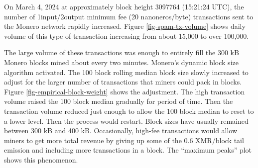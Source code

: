 \documentclass[usletter,11pt,english,openany]{article}
\begin{document}
On March 4, 2024 at approximately block height 3097764 (15:21:24 UTC),
the number of 1input/2output minimum fee (20 nanoneros/byte) transactions
sent to the Monero network rapidly increased. Figure \ref{fig-spam-tx-volume}
shows daily volume of this type of transaction increasing from about
15,000 to over 100,000.

The large volume of these transactions was enough to entirely fill
the 300 kB Monero blocks mined about every two minutes. Monero's dynamic
block size algorithm activated. The 100 block rolling median block
size slowly increased to adjust for the larger number of transactions
that miners could pack in blocks. Figure \ref{fig-empirical-block-weight}
shows the adjustment. The high transaction volume raised the 100 block
median gradually for period of time. Then the transaction volume reduced
just enough to allow the 100 block median to reset to a lower level.
Then the process would restart. Block sizes have usually remained
between 300 kB and 400 kB. Occasionally, high-fee transactions would
allow miners to get more total revenue by giving up some of the 0.6
XMR/block tail emission and including more transactions in a block.
The ``maximum peaks'' plot shows this phenomenon.
\end{document}
